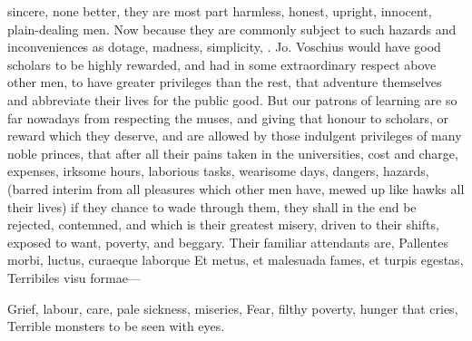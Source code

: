 {sincere, none better, they are most part harmless, honest, upright,
innocent, plain-dealing men.
Now because they are commonly subject to such hazards and
inconveniences as dotage, madness, simplicity, \etc{}. Jo. Voschius would
have good scholars to be highly rewarded, and had in some extraordinary
respect above other men, to have greater privileges than the
rest, that adventure themselves and abbreviate their lives for the
public good. But our patrons of learning are so far nowadays from
respecting the muses, and giving that honour to scholars, or reward
which they deserve, and are allowed by those indulgent privileges of
many noble princes, that after all their pains taken in the
universities, cost and charge, expenses, irksome hours, laborious
tasks, wearisome days, dangers, hazards, (barred interim from all
pleasures which other men have, mewed up like hawks all their lives) if
they chance to wade through them, they shall in the end be rejected,
contemned, and which is their greatest misery, driven to their shifts,
exposed to want, poverty, and beggary. Their familiar attendants are,
Pallentes morbi, luctus, curaeque laborque
Et metus, et malesuada fames, et turpis egestas,
Terribiles visu formae---

Grief, labour, care, pale sickness, miseries,
Fear, filthy poverty, hunger that cries,
Terrible monsters to be seen with eyes.

}
